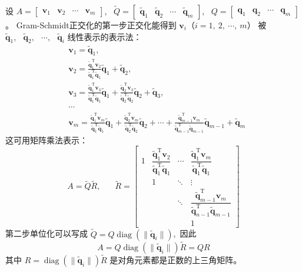 \documentclass[10pt, a4paper, oneside, fontset=none]{ctexart}
\theoremstyle{plain}
\theoremstyle{definition}
\newcommand{\com}{,\,\,\,\:}
\begin{document}
设
$A=\begin{bmatrix}\boldsymbol{v}_1&\boldsymbol{v}_2&\cdots&\boldsymbol{v}_m\end{bmatrix}$\com 
$\widetilde{Q}=\begin{bmatrix}\tilde{\boldsymbol{q}}_1&\tilde{\boldsymbol{q}}_2&\cdots&\tilde{\boldsymbol{q}}_m\end{bmatrix}$\com 
$Q=\begin{bmatrix}\boldsymbol{q}_1&\boldsymbol{q}_2&\cdots&\boldsymbol{q}_m\end{bmatrix}$。
Gram-Schmidt正交化的第一步正交化能得到 $\boldsymbol{v}_i$（$i=1,~2,~\cdots,~m$） 被 $\tilde{\boldsymbol{q}}_1\com \tilde{\boldsymbol{q}}_2\com \cdots\com \tilde{\boldsymbol{q}}_i$ 线性表示的表示法：
\begin{equation*}\begin{aligned}
    &\boldsymbol{v}_{1}=\tilde{\boldsymbol{q}}_{1}\com \\
    &\boldsymbol{v}_{2}=\frac{\tilde{\boldsymbol{q}}_{1}^{\mathrm{T}}\boldsymbol{v}_{2}}{\tilde{\boldsymbol{q}}_{1}^{\mathrm{T}}\tilde{\boldsymbol{q}}_{1}}\tilde{\boldsymbol{q}}_{1} + \tilde{\boldsymbol{q}}_{2} \com \\
    &\boldsymbol{v}_{3}=\frac{\tilde{\boldsymbol{q}}_{1}^{\mathrm{T}}\boldsymbol{v}_{3}}{\tilde{\boldsymbol{q}}_{1}^{\mathrm{T}}\tilde{\boldsymbol{q}}_{1}}\tilde{\boldsymbol{q}}_{1}+\frac{\tilde{\boldsymbol{q}}_{2}^{\mathrm{T}}\boldsymbol{v}_{3}}{\tilde{\boldsymbol{q}}_{2}^{\mathrm{T}}\tilde{\boldsymbol{q}}_{2}}\tilde{\boldsymbol{q}}_{2}+\tilde{\boldsymbol{q}}_{3}\com \\
    &\cdots\\
    &\boldsymbol{v}_{m}=\frac{\tilde{\boldsymbol{q}}_{1}^{\mathrm{T}}\boldsymbol{v}_{m}}{\tilde{\boldsymbol{q}}_{1}^{\mathrm{T}}\tilde{\boldsymbol{q}}_{1}}\tilde{\boldsymbol{q}}_{1}+\frac{\tilde{\boldsymbol{q}}_{2}^{\mathrm{T}}\boldsymbol{v}_{m}}{\tilde{\boldsymbol{q}}_{2}^{\mathrm{T}}\tilde{\boldsymbol{q}}_{2}}\tilde{\boldsymbol{q}}_{2}+\cdots+\frac{\tilde{\boldsymbol{q}}_{m-1}^{\mathrm{T}}\boldsymbol{v}_{m}}{\tilde{\boldsymbol{q}}_{m-1}^{\mathrm{T}}\tilde{\boldsymbol{q}}_{m-1}}\tilde{\boldsymbol{q}}_{m-1}+\tilde{\boldsymbol{q}}_{m}
\end{aligned}\end{equation*}
这可用矩阵乘法表示：
$$A=\widetilde{Q}\widetilde{R}\com \quad 
\widetilde{R}=
\begin{bmatrix}
    1&\dfrac{\tilde{\boldsymbol{q}}_1^\mathrm{T}\boldsymbol{v}_2}{\tilde{\boldsymbol{q}}_1^\mathrm{T}\tilde{\boldsymbol{q}}_1}&\cdots&\dfrac{\tilde{\boldsymbol{q}}_1^\mathrm{T}\boldsymbol{v}_m}{\tilde{\boldsymbol{q}}_1^\mathrm{T}\tilde{\boldsymbol{q}}_1}\\
    &1&\ddots&\vdots\\
    &&\ddots&\dfrac{\tilde{\boldsymbol{q}}_{m-1}^\mathrm{T}\boldsymbol{v}_m}{\tilde{\boldsymbol{q}}_{n-1}^\mathrm{T}\tilde{\boldsymbol{q}}_{m-1}}\\
    &&&1
\end{bmatrix}$$ 
第二步单位化可以写成 $\widetilde{Q}=Q\operatorname{diag}(\|\tilde{\boldsymbol{q}}_i\|)$\com 因此
$$A=Q\operatorname{diag}(\|\tilde{\boldsymbol{q}}_{i}\|)\widetilde{R}=QR$$
其中 $R=\operatorname{diag}(\|\tilde{\boldsymbol{q}}_i\|)\widetilde{R}$ 是对角元素都是正数的上三角矩阵。
\end{document}
